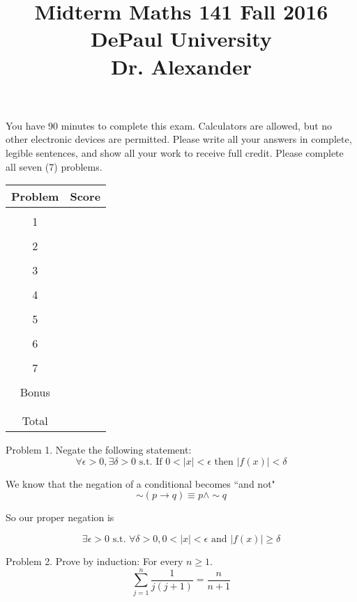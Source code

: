 \documentclass[16 pt]{amsart}
\theoremstyle{definition}
\theoremstyle{remark}
\numberwithin{equation}{subsection}
\begin{document}
\title{Midterm Maths 141 Fall 2016 \\ DePaul University\\Dr. Alexander}
\maketitle
You have 90 minutes to complete this exam.  Calculators are allowed, but no other electronic devices are permitted.  Please write all your answers in complete, legible sentences, and show all your work to receive full credit.  Please complete all seven (7) problems.


\begin{center}
  \begin{tabular}{ c | c }
    Problem & Score\\
    \hline
    &\\
    1&\\
    &\\
    2&\\
    &\\
    3&\\
    &\\
    4&\\
    &\\
    5&\\
    &\\
    6&\\
    &\\
    7&\\
    &\\
    Bonus&\\
    &\\
    \hline 
    &\\    
    Total& 
 \end{tabular}
\end{center}

\newpage 
Problem 1.  Negate the following statement:
\[
\forall \epsilon>0, \exists \delta>0 \text{ s.t. If } 0<|x|<\epsilon \text{ then } |f(x)|<\delta
\]

\vspace{1in}

We know that the negation of a conditional becomes ``and not"
\[
\sim (p\rightarrow q)\equiv p\wedge \sim q
\]

So our proper negation is

\[
\exists \epsilon>0 \text{ s.t. } \forall \delta>0,  0<|x|<\epsilon \text{ and } |f(x)|\ge\delta
\]

\newpage

Problem 2. Prove by induction: For every $n\ge 1$.
\[
\sum_{j=1}^{n} \frac{1}{j(j+1)} = \frac{n}{n+1}
\]
\end{document}
